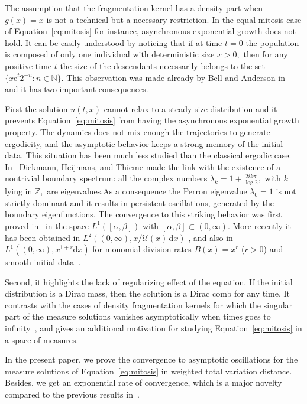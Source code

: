 \documentclass[AHL,Unicode,longabstracts,published]{cedram}
\newcommand{\Ucal}{\mathcal{U}}
\newcommand{\Z}{\mathbb{Z}}
\newcommand{\N}{\mathbb{N}}
\newcommand{\1}{\mathds{1}}
\newcommand{\e}{\mathrm{e}}
\renewcommand{\d}{\mathrm{d}}
\begin{document}
The assumption that the fragmentation kernel has a density part when $g(x)=x$ is not a technical but a necessary restriction. In the equal mitosis case of Equation~\eqref{eq:mitosis} for instance, asynchronous exponential growth does not hold. It can be easily understood by noticing that if at time $t=0$ the population is composed of only one individual with deterministic size $x>0,$ then for any positive time $t$ the size of the descendants necessarily belongs to the set $\{x\e^t2^{-n}: n\in\N\}$. This observation was made already by Bell and Anderson in~\cite{BellAnderson} and it has two important consequences.

First the solution $u(t,x)$ cannot relax to a steady size distribution and it prevents Equation~\eqref{eq:mitosis} from having the asynchronous exponential growth property. The dynamics does not mix enough the trajectories to generate ergodicity, and the asymptotic behavior keeps a strong memory of the initial data. This situation has been much less studied than the classical ergodic case. In~\cite{Diekmann1984,Heijmans1985} Diekmann, Heijmans, and Thieme made the link with the existence of a nontrivial boundary spectrum: all the complex numbers $\lambda_k=1+\frac{2ik\pi}{\log2},$ with $k$ lying in $\Z,$ are eigenvalues.\linebreak As a consequence the Perron eigenvalue $\lambda_0=1$ is not strictly dominant and it results in persistent oscillations, generated by the boundary eigenfunctions. The convergence to this striking behavior was first proved in~\cite{GreinerNagel} in the space $L^1([\alpha,\beta])$ with $[\alpha,\beta]\subset(0,\infty).$ More recently it has been obtained in $L^2((0,\infty),x/\Ucal(x)\,\d x)$ \cite{BDG}, and also in $L^1((0,\infty),x^{1+r}\d x)$ for monomial division rates $B(x)=x^r$ ($r>0$) and smooth initial data~\cite{vanBrunt2018}.

Second, it highlights the lack of regularizing effect of the equation. If the initial distribution is a Dirac mass, then the solution is a Dirac comb for any time. It contrasts with the cases of density fragmentation kernels for which the singular part of the measure solutions vanishes asymptotically when times goes to infinity~\cite{Debiec2018}, and gives an additional motivation for studying Equation~\eqref{eq:mitosis} in a space of measures.

In the present paper, we prove the convergence to asymptotic oscillations for the measure solutions of Equation~\eqref{eq:mitosis} in weighted total variation distance. Besides, we get an exponential rate of convergence, which is a major novelty compared to the previous results in~\cite{vanBrunt2018,BDG,GreinerNagel}.
\end{document}
